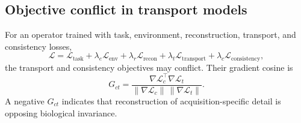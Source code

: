 \subsection{Objective conflict in transport models}
For an operator trained with task, environment, reconstruction, transport, and consistency losses,
\begin{equation}
  \mathcal L=\mathcal L_{\mathrm{task}}+\lambda_e\mathcal L_{\mathrm{env}}+
  \lambda_r\mathcal L_{\mathrm{recon}}+\lambda_t\mathcal L_{\mathrm{transport}}+
  \lambda_c\mathcal L_{\mathrm{consistency}},
\end{equation}
the transport and consistency objectives may conflict. Their gradient cosine is
\begin{equation}
  G_{ct}=\frac{\nabla\mathcal L_c^\top\nabla\mathcal L_t}{\|\nabla\mathcal L_c\|\,\|\nabla\mathcal L_t\|}.
\end{equation}
A negative $G_{ct}$ indicates that reconstruction of acquisition-specific detail is opposing biological invariance.
